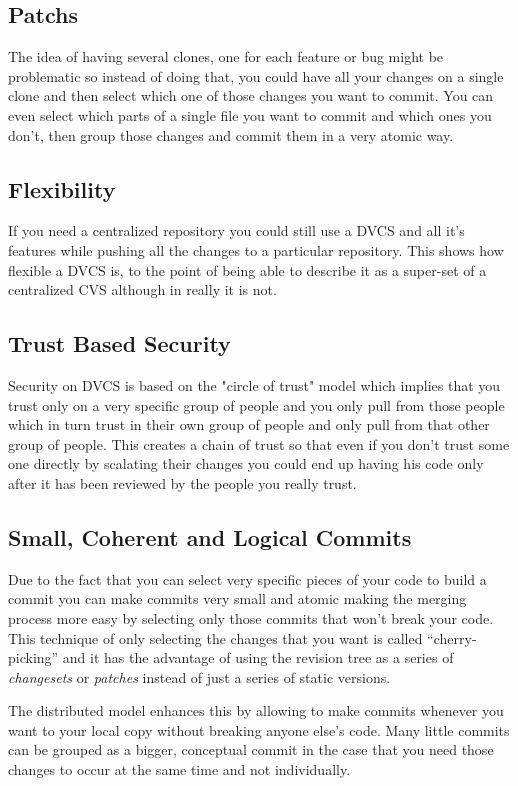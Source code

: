 \subsection{Patchs}
The idea of having several clones, one for each feature or bug might be problematic so instead of doing that, you could have all your changes on a single clone and then select which one of those changes you want to commit. You can even select which parts of a single file you want to commit and which ones you don't, then group those changes and commit them in a very atomic way.

\subsection{Flexibility}
If you need a centralized repository you could still use a DVCS and all it's features while pushing all the changes to a particular repository. This shows how flexible a DVCS is, to the point of being able to describe it as a super-set of a centralized CVS although in really it is not.

\subsection{Trust Based Security}
Security on DVCS is based on the "circle of trust" model which implies that you trust only on a very specific group of people and you only pull from those people which in turn trust in their own group of people and only pull from that other group of people. This creates a chain of trust so that even if you don't trust some one directly by scalating their changes you could end up having his code only after it has been reviewed by the people you really trust.

\subsection{Small, Coherent and Logical Commits}
Due to the fact that you can select very specific pieces of your code to build a commit you can make commits very small and atomic making the merging process more easy by selecting only those commits that won't break your code. This technique of only selecting the changes that you want is called ``cherry-picking'' and it has the advantage of using the revision tree as a 
series of \emph{changesets} or \emph{patches} instead of just a series of static versions. 

The distributed model enhances this by allowing to make commits whenever you want to your local copy without breaking anyone else's code. Many little commits can be grouped as a bigger, conceptual commit in the case that you need those changes to occur at the same time and not individually. 

